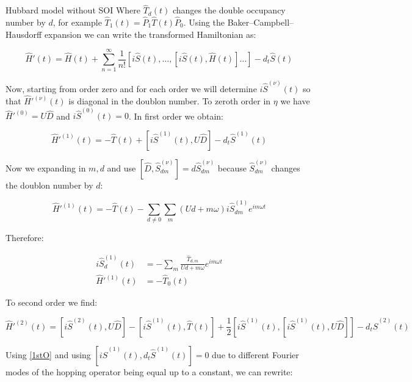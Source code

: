 \begin{section}{Hubbard model without SOI}
Where $\hat{T}_d(t)$ changes the double occupancy number by $d$, for example $\hat{T}_1(t) = \hat{P}_1 \hat{T}(t) \hat{P}_0$. Using the Baker–Campbell–Hausdorff expansion we can write the transformed Hamiltonian as:

\begin{equation}
\label{Perturbation}
\hat{H}'(t) = \hat{H}(t) + \sum_{n=1}^\infty \frac{1}{n!} \left[i\hat{S}(t), \dots, \left[ i\hat{S}(t), \hat{H}(t) \right]\dots \right] - d_t \hat{S}(t)
\end{equation}

Now, starting from order zero and for each order we will determine $i\hat{S}^{(\nu)}(t)$ so that $\hat{H}'^{(\nu)}(t)$ is diagonal in the doublon number. To zeroth order in $\eta$ we have $\hat{H}'^{(0)}= U\hat{D}$ and $i\hat{S}^{(0)}(t)=0$. In first order we obtain:

\begin{equation}
\label{1stO}
\hat{H}'^{(1)}(t) = -\hat{T}(t) + \left[ i\hat{S}^{(1)}(t), U\hat{D} \right] - d_t\hat{S}^{(1)}(t)
\end{equation}

Now we expanding in $m,d$ and use $\left[ \hat{D}, \hat{S}^{(\nu)}_{dm} \right] = d\hat{S}^{(\nu)}_{dm}$ because $\hat{S}^{(\nu)}_{dm}$ changes the doublon number by $d$:

\begin{equation}
\hat{H}'^{(1)}(t)=-\hat{T}(t)-\sum_{d\neq 0}\sum_m (Ud+m\omega) i\hat{S}^{(1)}_{dm} e^{im\omega t}
\end{equation}

Therefore:

\begin{align}
i\hat{S}^{(1)}_d(t) &= -\sum_m \frac{\hat{T}_{d,m}}{Ud+m\omega}e^{im\omega t} \label{1stOSpin}\\
\hat{H}'^{(1)}(t) &= -\hat{T}_0(t) \label{1stOH}
\end{align}

To second order we find:

\begin{equation}
\hat{H}'^{(2)}(t) = \left[i\hat{S}^{(2)}(t), U \hat{D} \right] - \left[ i\hat{S}^{(1)}(t), \hat{T}(t) \right] + \frac{1}{2}\left[ i\hat{S}^{(1)}(t), \left[ i\hat{S}^{(1)}(t), U\hat{D} \right] \right] - d_t\hat{S}^{(2)}(t)
\end{equation}

Using \ref{1stO} and using $\left[ i\hat{S}^{(1)}(t), d_t\hat{S}^{(1)}(t)\right] = 0$ due to different Fourier modes of the hopping operator being equal up to a constant, we can rewrite:


\end{section}
